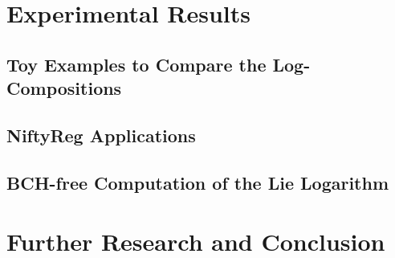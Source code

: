 

\section{Experimental Results}\label{ch:results}

\subsection{Toy Examples to Compare the Log-Compositions}

\subsection{NiftyReg Applications}

\subsection{BCH-free Computation of the Lie Logarithm }





\section{Further Research and Conclusion}\label{ch:conclusions}

